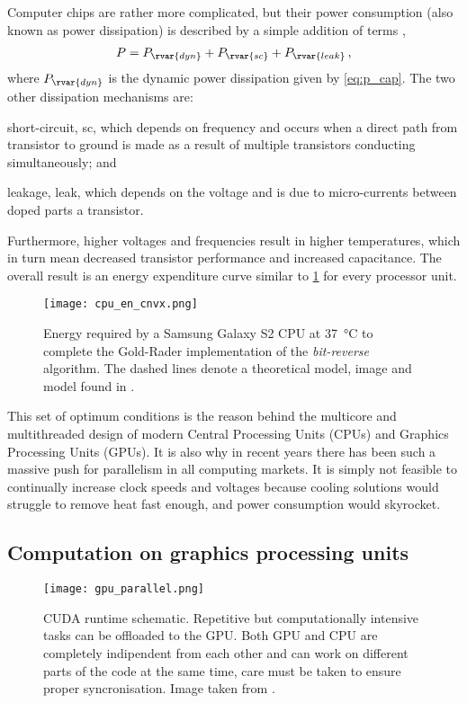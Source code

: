 Computer chips are rather more complicated, but their power consumption (also known as power dissipation) is described by a simple addition of terms \cite{cpu_pow},
\begin{align}
    P = P_{\rvar{dyn}} + P_{\rvar{sc}} + P_{\rvar{leak}}\,,
\end{align}
where $ P_{\rvar{dyn}} $ is the dynamic power dissipation given by \cref{eq:p_cap}. The two other dissipation mechanisms are:
\begin{inparaenum}[\itshape 1\upshape)]
    \item short-circuit, sc, which depends on frequency and occurs when a direct path from transistor to ground is made as a result of multiple transistors conducting simultaneously; and
    \item leakage, leak, which depends on the voltage and is due to micro-currents between doped parts a transistor.
\end{inparaenum}
Furthermore, higher voltages and frequencies result in higher temperatures, which in turn mean decreased transistor performance and increased capacitance. The overall result is an energy expenditure curve similar to \cref{f:cpu_en_cnvx} \cite{cpu_en_cnvx} for every processor unit.
\begin{figure}[t]
    \centering
    \texttt{[image: cpu\_en\_cnvx.png]}
    \caption[Energy expenditure of CPU vs Voltage.]{Energy required by a Samsung Galaxy S2 CPU at \SI{37}{\degreeCelsius} to complete the Gold-Rader implementation of the \emph{bit-reverse} algorithm. The dashed lines denote a theoretical model, image and model found in \cite{cpu_en_cnvx}.}
    \label{f:cpu_en_cnvx}
\end{figure}

This set of optimum conditions is the reason behind the multicore and multithreaded design of modern Central Processing Units (CPUs) and Graphics Processing Units (GPUs). It is also why in recent years there has been such a massive push for parallelism in all computing markets. It is simply not feasible to continually increase clock speeds and voltages because cooling solutions would struggle to remove heat fast enough, and power consumption would skyrocket.

\subsection{Computation on graphics processing units}
\label{sc:compgpu}

\begin{figure}
    \centering
    \texttt{[image: gpu\_parallel.png]}
    \caption[CUDA runtime schematic.]{CUDA runtime schematic. Repetitive but computationally intensive tasks can be offloaded to the GPU. Both GPU and CPU are completely indipendent from each other and can work on different parts of the code at the same time, care must be taken to ensure proper syncronisation. Image taken from \cite{nvidia}.}
    \label{f:cuda}
\end{figure}

